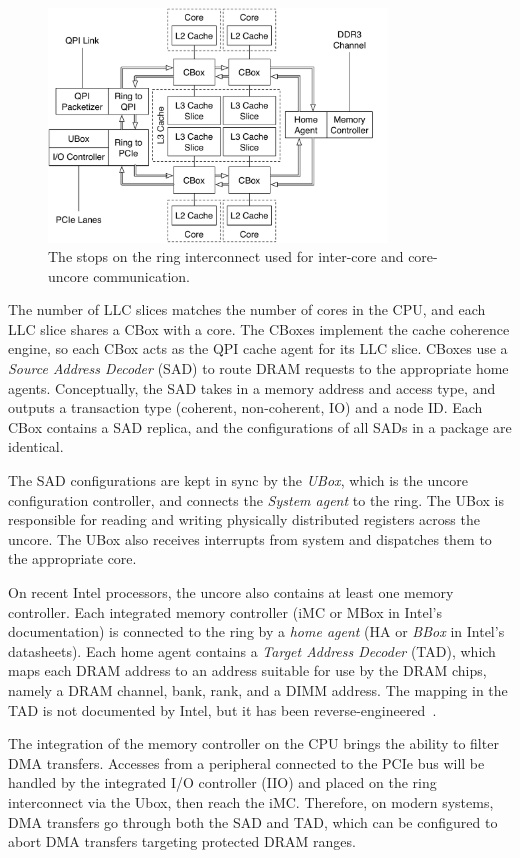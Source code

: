 \begin{figure}[hbt]
  \centering
  \includegraphics[width=90mm]{figures/cpu_uncore.pdf}
  \caption{
    The stops on the ring interconnect used for inter-core and core-uncore
    communication.
  }
  \label{fig:cpu_uncore}
\end{figure}

The number of LLC slices matches the number of cores in the CPU, and each LLC
slice shares a CBox with a core. The CBoxes implement the cache coherence
engine, so each CBox acts as the QPI cache agent for its LLC slice. CBoxes
use a \textit{Source Address Decoder} (SAD) to route DRAM requests to the
appropriate home agents. Conceptually, the SAD takes in a memory address and
access type, and outputs a transaction type (coherent, non-coherent, IO) and a
node ID. Each CBox contains a SAD replica, and the configurations of all SADs
in a package are identical.

The SAD configurations are kept in sync by the \textit{UBox}, which is the
uncore configuration controller, and connects the \textit{System agent} to the
ring. The UBox is responsible for reading and writing physically distributed
registers across the uncore. The UBox also receives interrupts from system and
dispatches them to the appropriate core.

On recent Intel processors, the uncore also contains at least one memory
controller. Each integrated memory controller (iMC or MBox in Intel's
documentation) is connected to the ring by a \textit{home agent} (HA or
\textit{BBox} in Intel's datasheets). Each home agent contains a
\textit{Target Address Decoder} (TAD), which maps each DRAM address to an
address suitable for use by the DRAM chips, namely a DRAM channel, bank, rank,
and a DIMM address. The mapping in the TAD is not documented by Intel, but it
has been reverse-engineered~\cite{pessil2015dramaddressing}.

The integration of the memory controller on the CPU brings the ability to
filter DMA transfers. Accesses from a peripheral connected to the PCIe bus will
be handled by the integrated I/O controller (IIO) and placed on the ring
interconnect via the Ubox, then reach the iMC. Therefore, on modern systems,
DMA transfers go through both the SAD and TAD, which can be configured to
abort DMA transfers targeting protected DRAM ranges.


